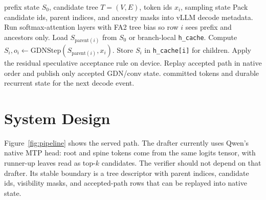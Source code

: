 \documentclass[conference]{IEEEtran}
\newcommand{\code}[1]{\texttt{#1}}
\begin{document}
\begin{algorithm}[t]
\caption{Tree verification on a recurrent hybrid target}
\label{alg:tree}
\begin{algorithmic}[1]
\REQUIRE prefix state \(S_0\), candidate tree \(T=(V,E)\), token ids \(x_i\), sampling state
\STATE Pack candidate ids, parent indices, and ancestry masks into vLLM decode metadata.
\STATE Run softmax-attention layers with FA2 tree bias so row \(i\) sees prefix and ancestors only.
        \STATE Load \(S_{\mathrm{parent}(i)}\) from \(S_0\) or branch-local \code{h\_cache}.
        \STATE Compute \(S_i, o_i \leftarrow \mathrm{GDNStep}(S_{\mathrm{parent}(i)},x_i)\).
        \STATE Store \(S_i\) in \code{h\_cache[i]} for children.
    \ENDFOR
\ENDFOR
\STATE Apply the residual speculative acceptance rule on device.
\STATE Replay accepted path in native order and publish only accepted GDN/conv state.
\RETURN committed tokens and durable recurrent state for the next decode event.
\end{algorithmic}
\end{algorithm}

\section{System Design}

Figure~\ref{fig:pipeline} shows the served path. The drafter currently uses Qwen's native MTP head: root and spine tokens come from the same logits tensor, with runner-up leaves read as top-\(k\) candidates. The verifier should not depend on that drafter. Its stable boundary is a tree descriptor with parent indices, candidate ids, visibility masks, and accepted-path rows that can be replayed into native state.
\end{document}
